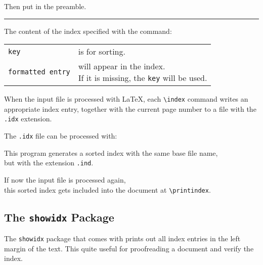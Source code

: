 \documentclass[a4paper]{article}
\begin{document}
\rule{0em}{2ex}


\rule{0em}{2ex}

Then put  in the preamble.

\rule{0em}{2ex}

\rule{\textwidth}{0.5pt}

\rule{0em}{2ex}

The content of the index specified with the command:

\rule{0em}{2ex}


\rule{0em}{2ex}

\begin{tabular}{l @{~~~~~~~~} l}
\verb|key|                  &       is for sorting.\\
\verb|formatted entry|      &       \parbox[t]{8cm}{%
will appear in the index.\\
If it is missing, the \texttt{key} will be used.}
\end{tabular}

\rule{0em}{2ex}

When the input file is processed with \LaTeX{},
each \verb|\index| command writes an appropriate index entry,
together with the current page number to a file with the \verb|.idx| extension.

\rule{0em}{2ex}

The \verb|.idx| file can be processed with:

\rule{0em}{2ex}


\rule{0em}{2ex}

This program generates a sorted index with the same base file name,\\
but with the \mbox{extension} \verb|.ind|.

\rule{0em}{2ex}

\begin{center}
\end{center}

\rule{0em}{2ex}

If now the input file is processed again,\\
this sorted index gets included into the document at \verb|\printindex|.

\rule{0em}{2ex}


\newpage
\subsection{The \texttt{showidx} Package}
The \verb|showidx| package that comes with \LaTeXe{} prints out all index entries
in the left margin of the text. This quite useful for proofreading a document and verify the index.

\rule{0em}{0.5pt}

\end{document}
